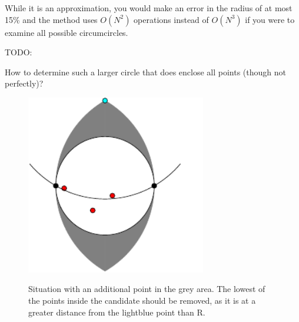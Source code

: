 \documentclass[onecolumn]{article}
\begin{document}
While it is an approximation, you would make an error in the radius of at most 15\% and the method uses
$O(N^2)$ operations instead of $O(N^3)$ if you were to examine all possible circumcircles.

TODO:

How to determine such a larger circle that does enclose all points (though not perfectly)?

\begin{figure}[h]
\begin{center}
\caption{Situation with an additional point in the grey area. The lowest of the points inside the candidate
should be removed, as it is at a greater distance from the lightblue point than R.\\
}
\includegraphics[width=0.7\textwidth]{point_outside.pdf}
\label{point_outside}
\end{center}
\end{figure}
\end{document}
